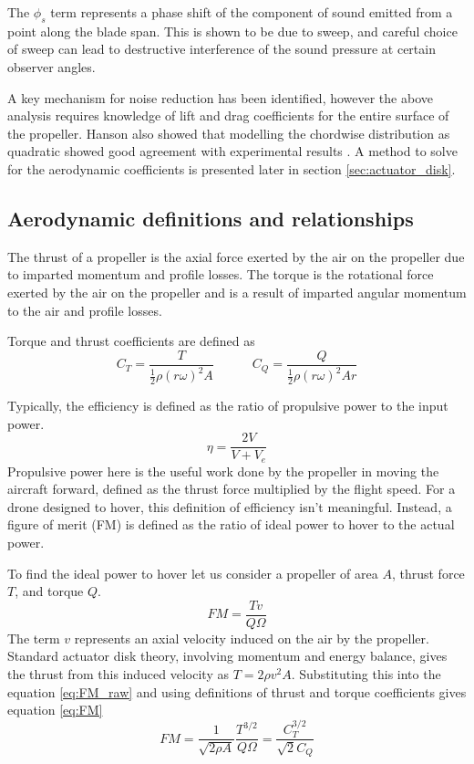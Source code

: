 \documentclass[12pt,a4paper]{article}
\begin{document}
The $\phi_s$ term represents a phase shift of the component of sound emitted from a point along the blade span.
This is shown to be due to sweep, and careful choice of sweep can lead to destructive interference of the sound pressure at certain observer angles.


A key mechanism for noise reduction has been identified, however the above analysis requires knowledge of lift and drag coefficients for the entire surface of the propeller.
Hanson also showed that modelling the chordwise distribution as quadratic showed good agreement with experimental results \cite{hanson_influence}.
A method to solve for the aerodynamic coefficients is presented later in section \ref{sec:actuator_disk}.

\subsection{Aerodynamic definitions and relationships}

The thrust of a propeller is the axial force exerted by the air on the propeller due to imparted momentum and profile losses.
The torque is the rotational force exerted by the air on the propeller and is a result of imparted angular momentum to the air and profile losses.

Torque and thrust coefficients are defined as
\begin{equation}
    C_T = \frac{T}{\frac{1}{2} \rho (r\omega)^2 A} \quad \quad \quad C_Q = \frac{Q}{\frac{1}{2} \rho (r\omega)^2 A r} \label{eq:CT_CQ}
\end{equation}


Typically, the efficiency is defined as the ratio of propulsive power to the input power.
\begin{equation}
    \eta = \frac{2 V}{V + V_e}
\end{equation}
Propulsive power here is the useful work done by the propeller in moving the aircraft forward, defined as the thrust force multiplied by the flight speed.
For a drone designed to hover, this definition of efficiency isn't meaningful.
Instead, a figure of merit (FM) is defined as the ratio of ideal power to hover to the actual power.

To find the ideal power to hover let us consider a propeller of area $A$, thrust force $T$, and torque $Q$.
\begin{equation}
    FM = \frac{Tv}{Q \Omega} \label{eq:FM_raw}
\end{equation}
The term $v$ represents an axial velocity induced on the air by the propeller.
Standard actuator disk theory, involving momentum and energy balance, gives the thrust from this induced velocity as $ T = 2 \rho v^2 A$.
Substituting this into the equation \ref{eq:FM_raw} and using definitions of thrust and torque coefficients gives equation \ref{eq:FM}
\begin{equation}
    FM = \frac{1}{ \sqrt{2 \rho A}} \frac{T^{3/2}}{Q \Omega} = \frac{C_T^{3/2}}{\sqrt{2}C_Q} \label{eq:FM}
\end{equation}
\end{document}
